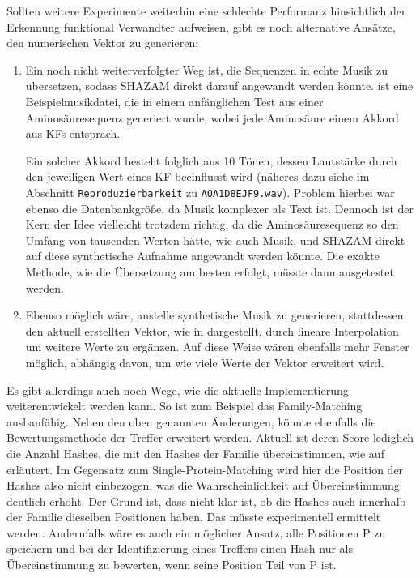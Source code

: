         Sollten weitere Experimente weiterhin eine schlechte Performanz hinsichtlich der Erkennung funktional Verwandter aufweisen, gibt es noch alternative Ansätze, den numerischen Vektor zu generieren:
        \begin{enumerate}
            \item Ein noch nicht weiterverfolgter Weg ist, die Sequenzen in echte Musik zu übersetzen, sodass SHAZAM direkt darauf angewandt werden könnte.  ist eine Beispielmusikdatei, die in einem anfänglichen Test aus einer Aminosäuresequenz generiert wurde, wobei jede Aminosäure einem Akkord aus \acp{KF} entsprach.

            Ein solcher Akkord besteht folglich aus 10 Tönen, dessen Lautstärke durch den jeweiligen Wert eines \ac{KF} beeinflusst wird (näheres dazu siehe  im Abschnitt \texttt{Reproduzierbarkeit} zu \texttt{A0A1D8EJF9.wav}). Problem hierbei war ebenso die Datenbankgröße, da Musik komplexer als Text ist. Dennoch ist der Kern der Idee vielleicht trotzdem richtig, da die Aminosäuresequenz so den Umfang von tausenden Werten hätte, wie auch Musik, und SHAZAM direkt auf diese synthetische Aufnahme angewandt werden könnte. Die exakte Methode, wie die Übersetzung am besten erfolgt, müsste dann ausgetestet werden.

            \item Ebenso möglich wäre, anstelle synthetische Musik zu generieren, stattdessen den aktuell erstellten Vektor, wie in  dargestellt, durch lineare Interpolation um weitere Werte zu ergänzen. Auf diese Weise wären ebenfalls mehr Fenster möglich, abhängig davon, um wie viele Werte der Vektor erweitert wird.
        \end{enumerate}
        
        Es gibt allerdings auch noch Wege, wie die aktuelle Implementierung weiterentwickelt werden kann. So ist zum Beispiel das Family-Matching ausbaufähig. Neben den oben genannten Änderungen, könnte ebenfalls die Bewertungsmethode der Treffer erweitert werden. Aktuell ist deren Score lediglich die Anzahl Hashes, die mit den Hashes der Familie übereinstimmen, wie auf  erläutert. Im Gegensatz zum Single-Protein-Matching wird hier die Position der Hashes also nicht einbezogen, was die Wahrscheinlichkeit auf Übereinstimmung deutlich erhöht. Der Grund ist, dass nicht klar ist, ob die Hashes auch innerhalb der Familie dieselben Positionen haben. Das müsste experimentell ermittelt werden. Andernfalls wäre es auch ein möglicher Ansatz, alle Positionen P zu speichern und bei der Identifizierung eines Treffers einen Hash nur als Übereinstimmung zu bewerten, wenn seine Position Teil von P ist.

